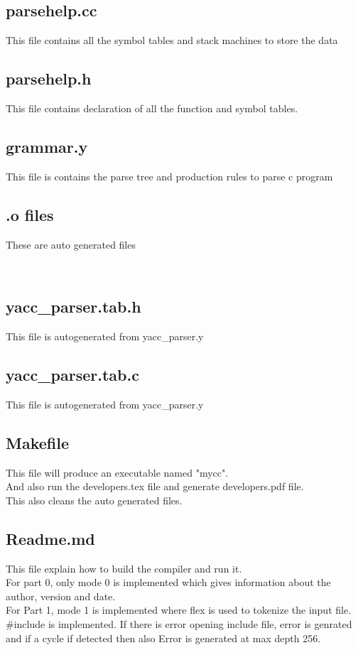 \documentclass{article}
\begin{document}
\subsection*{parsehelp.cc}
This file contains all the symbol tables and stack machines to store the data\\

\subsection*{parsehelp.h}
This file contains declaration of all the function and symbol tables.\\

\subsection*{grammar.y}
This file is contains the parse tree and production rules to parse c program\\

\subsection*{.o files}
These are auto generated files

\

\subsection*{yacc\_parser.tab.h}
This file is autogenerated from yacc\_parser.y \\

\subsection*{yacc\_parser.tab.c}
This file is autogenerated from yacc\_parser.y \\

\subsection*{Makefile}
This file will produce an executable named "mycc". \\
And also run the developers.tex file and generate developers.pdf file. \\
This also cleans the auto generated files. \\

\subsection*{Readme.md}
This file explain how to build the compiler and run it. \\
For part 0, only mode 0 is implemented which gives information about the author, version and date. \\
For Part 1,  mode 1 is implemented where flex is used to tokenize the input file. \\
$\#$include is implemented.
If there is error opening include file, error is genrated and if a cycle if detected then also Error is generated at max depth 256. \\
\end{document}
